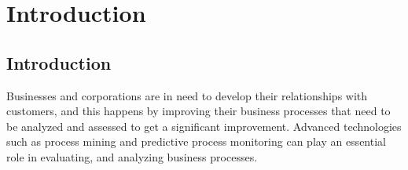 

\chapter{Introduction} \label{ch1}

\ifpdf
    \graphicspath{{1_introduction/figures/PNG/}{1_introduction/figures/PDF/}{1_introduction/figures/}}
\else
    \graphicspath{{1_introduction/figures/EPS/}{1_introduction/figures/}}
\fi







\theoremstyle{definition}
\newtheorem{definition}{Definition}[section]

\section{Introduction} \label{intro} %
Businesses and corporations are in need to develop their relationships with customers, and this happens by improving their business processes that need to be analyzed and assessed to get a significant improvement. Advanced technologies such as process mining and predictive process monitoring can play an essential role in evaluating, and analyzing business processes.

